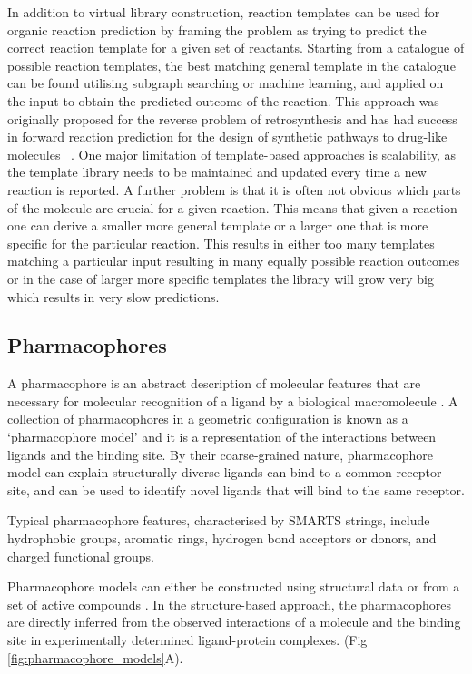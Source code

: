 In addition to virtual library construction, reaction templates can be used for organic reaction prediction by framing the problem as trying to predict the correct reaction template for a given set of reactants. Starting from a catalogue of possible reaction templates, the best matching general template in the catalogue can be found utilising subgraph searching or machine learning, and applied on the input to obtain the predicted outcome of the reaction. This approach was originally proposed for the reverse problem of retrosynthesis \cite{Corey1985ComputerAssistedSynthesis} and has had success in forward reaction prediction for the design of synthetic pathways to drug-like molecules ~\cite{Klucznik2018EfficientLaboratory}. One major limitation of template-based approaches is scalability, as the template library needs to be maintained and updated every time a new reaction is reported. A further problem is that it is often not obvious which parts of the molecule are crucial for a given reaction. This means that given a reaction one can derive a smaller more general template or a larger one that is more specific for the particular reaction. This results in either too many templates matching a particular input resulting in many equally possible reaction outcomes or in the case of larger more specific templates the library will grow very big which results in very slow predictions.

\subsection{Pharmacophores} \label{subsec:pharmacophores}

A pharmacophore is an abstract description of molecular features that are necessary for molecular recognition of a ligand by a biological macromolecule \cite{Kaserer2015PharmacophoreReview}. A collection of pharmacophores in a geometric configuration is known as a `pharmacophore model' and it is a representation of the interactions between ligands and the binding site. By their coarse-grained nature, pharmacophore model can explain structurally diverse ligands can bind to a common receptor site, and can be used to identify novel ligands that will bind to the same receptor.

Typical pharmacophore features, characterised by SMARTS strings, include hydrophobic groups, aromatic rings, hydrogen bond acceptors or donors, and charged functional groups.

Pharmacophore models can either be constructed using structural data or from a set of active compounds \cite{Vuorinen2015pharmacophore}. In the structure-based approach, the pharmacophores are directly inferred from the observed interactions of a molecule and the binding site in experimentally determined ligand-protein complexes. (Fig \ref{fig:pharmacophore_models}A).

